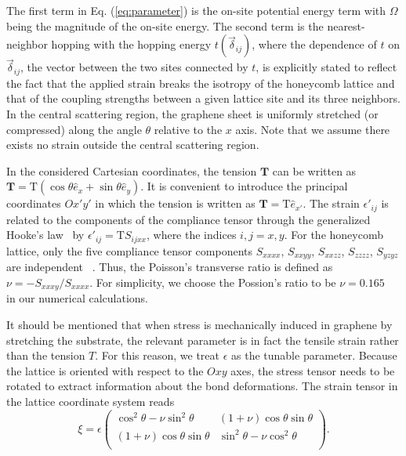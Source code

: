 \documentclass[reprint,amsmath,amssymb,aps,superscriptaddress]{revtex4-2}
\begin{document}
The first term in Eq. (\ref{eq:parameter}) is the on-site potential energy term with $\Omega$ being the magnitude of the on-site energy. The second term is the nearest-neighbor hopping with the hopping energy $t(\vec{\delta}_{ij})$, where the dependence of $t$ on $\vec{\delta}_{ij}$, the vector between the two sites connected by $t$, is explicitly stated to reflect the fact that the applied strain breaks the isotropy of the honeycomb lattice and that of the coupling strengths between a given lattice site and its three neighbors. In the central scattering region, the graphene sheet is uniformly stretched (or compressed) along the angle $\theta$ relative to the $x$ axis. Note that we assume there exists no strain outside the central scattering region.

In the considered Cartesian coordinates, the tension $\mathbf{T}$ can be written as $\mathbf{T}=\mathrm{T}(\cos\theta \hat{e}_x+\sin\theta \hat{e}_y)$.
It is convenient to introduce the principal coordinates $Ox'y'$ in which the tension is written as $\mathbf{T}=\mathrm{T}\hat{e}_{x'}$.
The strain $\epsilon'_{ij}$ is related to the components of the compliance tensor through the generalized Hooke's law~\cite{liyuan2018} by
$\epsilon'_{ij}=\mathrm{T}S_{ijxx}$,
where the indices $i, j=x,y$. For the honeycomb lattice, only the five compliance tensor components $S_{xxxx}$, $S_{xxyy}$, $S_{xxzz}$, $S_{zzzz}$, $S_{yzyz}$ are independent ~\cite{Blakslee1970}.  Thus, the Poisson's
transverse ratio is defined as $\nu=-S_{xxxy}/S_{xxxx}$. For simplicity,  we choose the Possion's ratio to be $\nu=0.165$~\cite{Pereira2009} in our numerical calculations.

It should be mentioned that when stress is mechanically induced in graphene by stretching the substrate, the relevant parameter is in fact the tensile strain rather than the tension $T$. For this reason, we treat $\epsilon$ as the tunable parameter. Because the lattice is oriented with respect to the $Oxy$ axes, the stress tensor needs to be rotated to extract information about the  bond deformations. The strain tensor in the lattice coordinate system reads
\begin{equation} \label{eq:tensor}
	\xi=\epsilon\left(
	\begin{array}{cc}
		\cos^2\theta-\nu \sin^2\theta & (1+\nu) \cos\theta \sin\theta\\
		(1+\nu) \cos\theta \sin\theta & \sin^2\theta-\nu \cos^2\theta\\
	\end{array}
	\right).
\end{equation}
\end{document}

